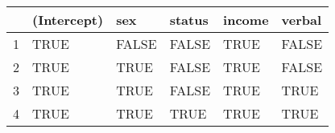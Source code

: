 \begin{table}[ht]
\centering
\begin{tabular}{rlllll}
  \hline
 & (Intercept) & sex & status & income & verbal \\ 
  \hline
1 & TRUE & FALSE & FALSE & TRUE & FALSE \\ 
  2 & TRUE & TRUE & FALSE & TRUE & FALSE \\ 
  3 & TRUE & TRUE & FALSE & TRUE & TRUE \\ 
  4 & TRUE & TRUE & TRUE & TRUE & TRUE \\ 
   \hline
\end{tabular}
\end{table}
